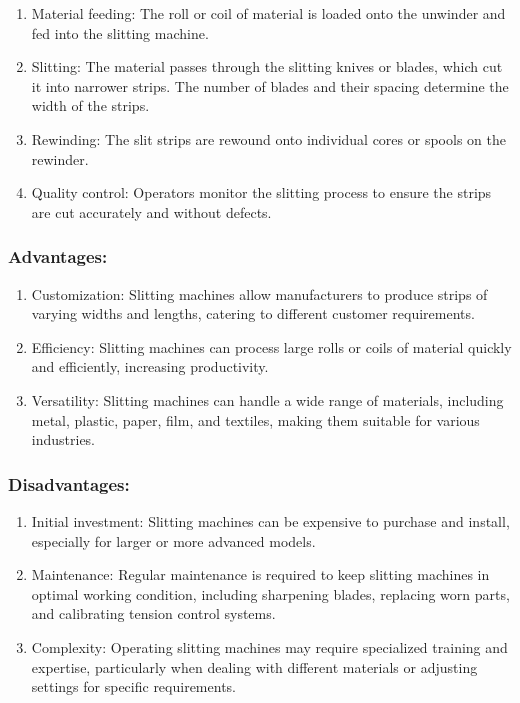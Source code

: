 \begin{enumerate}
\item
  Material feeding: The roll or coil of material is loaded onto the
  unwinder and fed into the slitting machine.
\item
  Slitting: The material passes through the slitting knives or blades,
  which cut it into narrower strips. The number of blades and their
  spacing determine the width of the strips.
\item
  Rewinding: The slit strips are rewound onto individual cores or spools
  on the rewinder.
\item
  Quality control: Operators monitor the slitting process to ensure the
  strips are cut accurately and without defects.
\end{enumerate}

\subsubsection{Advantages:}

\begin{enumerate}
\item
  Customization: Slitting machines allow manufacturers to produce strips
  of varying widths and lengths, catering to different customer
  requirements.
\item
  Efficiency: Slitting machines can process large rolls or coils of
  material quickly and efficiently, increasing productivity.
\item
  Versatility: Slitting machines can handle a wide range of materials,
  including metal, plastic, paper, film, and textiles, making them
  suitable for various industries.
\end{enumerate}

\subsubsection{Disadvantages:}

\begin{enumerate}
\item
  Initial investment: Slitting machines can be expensive to purchase and
  install, especially for larger or more advanced models.
\item
  Maintenance: Regular maintenance is required to keep slitting machines
  in optimal working condition, including sharpening blades, replacing
  worn parts, and calibrating tension control systems.
\item
  Complexity: Operating slitting machines may require specialized
  training and expertise, particularly when dealing with different
  materials or adjusting settings for specific requirements.
\end{enumerate}

